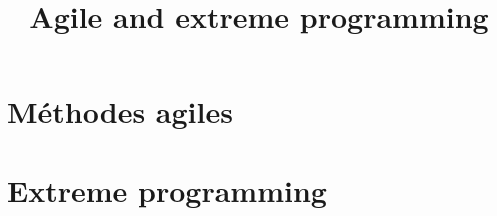 \documentclass{beamer}
\title{Agile and extreme programming}
\begin{document}
    \begin{frame}

    \maketitle

    \end{frame}
    
    \section{Méthodes agiles}
    
	
	\section{Extreme programming}
    
\end{document}
